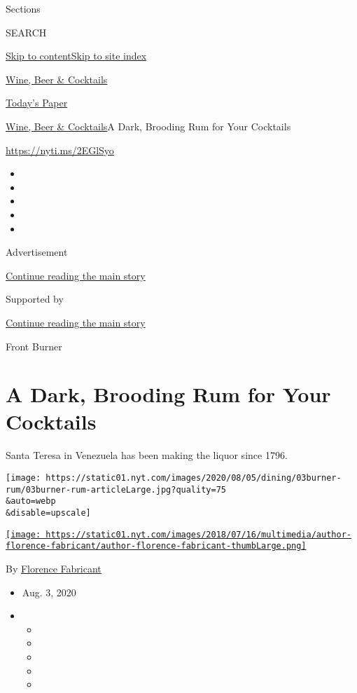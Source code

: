 Sections

SEARCH

\protect\hyperlink{site-content}{Skip to
content}\protect\hyperlink{site-index}{Skip to site index}

\href{https://www.nytimes.com/section/food/drinks}{Wine, Beer \&
Cocktails}

\href{https://myaccount.nytimes.com/auth/login?response_type=cookie\&client_id=vi}{}

\href{https://www.nytimes.com/section/todayspaper}{Today's Paper}

\href{/section/food/drinks}{Wine, Beer \& Cocktails}\textbar{}A Dark,
Brooding Rum for Your Cocktails

\url{https://nyti.ms/2EGlSyo}

\begin{itemize}
\item
\item
\item
\item
\item
\end{itemize}

Advertisement

\protect\hyperlink{after-top}{Continue reading the main story}

Supported by

\protect\hyperlink{after-sponsor}{Continue reading the main story}

Front Burner

\hypertarget{a-dark-brooding-rum-for-your-cocktails}{%
\section{A Dark, Brooding Rum for Your
Cocktails}\label{a-dark-brooding-rum-for-your-cocktails}}

Santa Teresa in Venezuela has been making the liquor since 1796.

\texttt{[image: https://static01.nyt.com/images/2020/08/05/dining/03burner-rum/03burner-rum-articleLarge.jpg?quality=75\\\&auto=webp\\\&disable=upscale]}

\href{https://www.nytimes.com/by/florence-fabricant}{\texttt{[image: https://static01.nyt.com/images/2018/07/16/multimedia/author-florence-fabricant/author-florence-fabricant-thumbLarge.png]}}

By \href{https://www.nytimes.com/by/florence-fabricant}{Florence
Fabricant}

\begin{itemize}
\item
  Aug. 3, 2020
\item
  \begin{itemize}
  \item
  \item
  \item
  \item
  \item
  \end{itemize}
\end{itemize}

